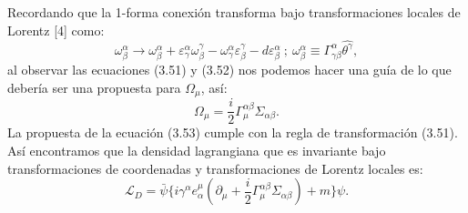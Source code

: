 Recordando que la 1-forma conexión transforma bajo transformaciones locales de Lorentz [4] como:
\begin{equation}
\omega_{\beta}^{\alpha}\to\omega_{\beta}^{\alpha}+\varepsilon_{\gamma}^{\alpha}\omega_{\beta}^{\gamma}-\omega_{\gamma}^{\alpha}\varepsilon_{\beta}^{\gamma}-d\varepsilon_{\beta}^{\alpha} \ ; \ \omega_{\beta}^{\alpha}\equiv\Gamma_{\gamma\beta}^{\alpha}\hat{\theta^{\gamma}} ,
\end{equation}
al observar las ecuaciones (3.51) y (3.52) nos podemos hacer una guía de lo que debería ser una propuesta para $\Omega_\mu$, así:
\begin{equation}
\Omega_{\mu}=\frac{i}{2}\Gamma_{\mu}^{\alpha\beta}\Sigma_{\alpha\beta} .
\end{equation} 
La propuesta de la ecuación (3.53) cumple con la regla de transformación (3.51). Así encontramos que la densidad lagrangiana que es invariante bajo transformaciones de coordenadas y transformaciones de Lorentz locales es:
\begin{equation}
\mathcal{L}_{D}=\bar{\psi}\{i\gamma^{\alpha}e_{\alpha}^{\mu}(\partial_{\mu}+\frac{i}{2}\Gamma_{\mu}^{\alpha\beta}\Sigma_{\alpha\beta})+m\}\psi .
\end{equation}


